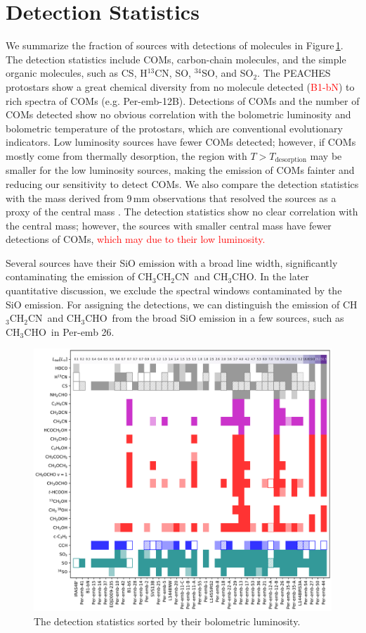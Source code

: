 \documentclass[twocolumn]{aastex62}
\newcommand{\htcn}{\mbox{H$^{13}$CN}}
\newcommand{\acetaldehyde}{\mbox{CH$_{3}$CHO}}
\newcommand{\ethylcyanide}{\mbox{CH$_{3}$CH$_{2}$CN}}
\begin{document}
\section{Detection Statistics}
We summarize the fraction of sources with detections of molecules in Figure\,\ref{fig:stats}.  The detection statistics include COMs, carbon-chain molecules, and the simple organic molecules, such as CS, \htcn, SO, $^{34}$SO, and SO$_{2}$.  The PEACHES protostars show a great chemical diversity from no molecule detected (\textcolor{red}{B1-bN}) to rich spectra of COMs (e.g. Per-emb-12B).  Detections of COMs and the number of COMs detected show no obvious correlation with the bolometric luminosity and bolometric temperature of the protostars, which are conventional evolutionary indicators.  Low luminosity sources have fewer COMs detected; however, if COMs mostly come from thermally desorption, the region with $T > T_\text{desorption}$ may be smaller for the low luminosity sources, making the emission of COMs fainter and reducing our sensitivity to detect COMs.  We also compare the detection statistics with the mass derived from 9\,mm observations that resolved the sources as a proxy of the central mass \citep{2018ApJS..238...19T}.  The detection statistics show no clear correlation with the central mass; however, the sources with smaller central mass have fewer detections of COMs, \textcolor{red}{which may due to their low luminosity.}  

Several sources have their SiO emission with a broad line width, significantly contaminating the emission of \ethylcyanide\ and \acetaldehyde.  In the later quantitative discussion, we exclude the spectral windows contaminated by the SiO emission.  For assigning the detections, we can distinguish the emission of \ethylcyanide\ and \acetaldehyde\ from the broad SiO emission in a few sources, such as \acetaldehyde\ in Per-emb 26.

\begin{figure}[htbp!]
  \centering
  \includegraphics[width=\textwidth]{stats_sorted_by_lbol.pdf}
  \caption{The detection statistics sorted by their bolometric luminosity.}
  \label{fig:stats}
\end{figure}
\end{document}
